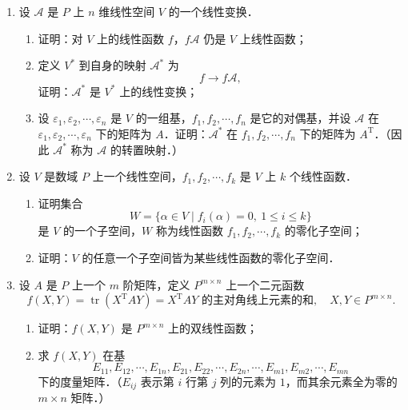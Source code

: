 \begin{enumerate}
  \item 设 $\mathcal{A}$ 是 $P$ 上 $n$ 维线性空间 $V$ 的一个线性变换．
  \begin{enumerate}
    \item 证明：对 $V$ 上的线性函数 $f$，$f\mathcal{A}$ 仍是 $V$ 上线性函数；
  \anssub
    \item 定义 $V^*$ 到自身的映射 $\mathcal{A}^*$ 为
    \[
      f\to f\mathcal{A},
    \]
    证明：$\mathcal{A}^*$ 是 $V^*$ 上的线性变换；
  \anssub
    \item 设 $\varepsilon_1,\varepsilon_2,\cdots,\varepsilon_n$ 是 $V$ 的一组基，$f_1,f_2,\cdots,f_n$ 是它的对偶基，并设 $\mathcal{A}$ 在 $\varepsilon_1,\varepsilon_2,\cdots,\varepsilon_n$ 下的矩阵为 $A$．证明：$\mathcal{A}^*$ 在 $f_1,f_2,\cdots,f_n$ 下的矩阵为 $A^{\mathrm{T}}$．（因此 $\mathcal{A}^*$ 称为 $\mathcal{A}$ 的转置映射．）
  \anssub
  \end{enumerate}

  \item 设 $V$ 是数域 $P$ 上一个线性空间，$f_1,f_2,\cdots,f_k$ 是 $V$ 上 $k$ 个线性函数．
  \begin{enumerate}
    \item 证明集合
    \[
      W=\{\alpha\in V\mid f_i(\alpha)=0,\ 1\leq i\leq k\}
    \]
    是 $V$ 的一个子空间，$W$ 称为线性函数 $f_1,f_2,\cdots,f_k$ 的零化子空间；
  \anssub
    \item 证明：$V$ 的任意一个子空间皆为某些线性函数的零化子空间．
  \anssub
  \end{enumerate}

  \item 设 $A$ 是 $P$ 上一个 $m$ 阶矩阵，定义 $P^{m\times n}$ 上一个二元函数
  \[
    f(X,Y)=\operatorname{tr}(X^{\mathrm{T}}AY)=X^{\mathrm{T}}AY\text{ 的主对角线上元素的和},\quad X,Y\in P^{m\times n}.
  \]
  \begin{enumerate}
    \item 证明：$f(X,Y)$ 是 $P^{m\times n}$ 上的双线性函数；
  \anssub
    \item 求 $f(X,Y)$ 在基
    \[
      E_{11},E_{12},\cdots,E_{1n},E_{21},E_{22},\cdots,E_{2n},\cdots,E_{m1},E_{m2},\cdots,E_{mn}
    \]
    下的度量矩阵．（$E_{ij}$ 表示第 $i$ 行第 $j$ 列的元素为 $1$，而其余元素全为零的 $m\times n$ 矩阵．）
  \anssub
  \end{enumerate}


\end{enumerate}
